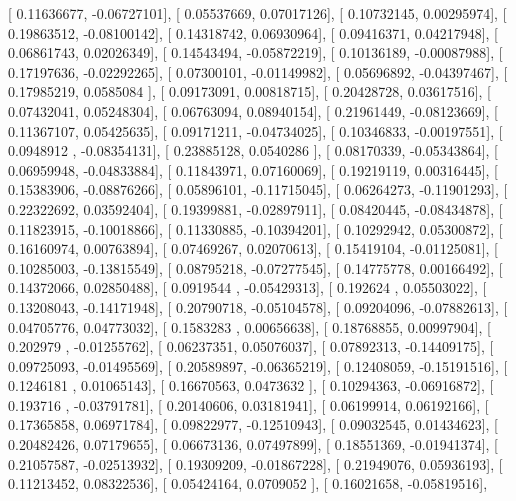 \documentclass{article}
\begin{document}
       [ 0.11636677, -0.06727101],
       [ 0.05537669,  0.07017126],
       [ 0.10732145,  0.00295974],
       [ 0.19863512, -0.08100142],
       [ 0.14318742,  0.06930964],
       [ 0.09416371,  0.04217948],
       [ 0.06861743,  0.02026349],
       [ 0.14543494, -0.05872219],
       [ 0.10136189, -0.00087988],
       [ 0.17197636, -0.02292265],
       [ 0.07300101, -0.01149982],
       [ 0.05696892, -0.04397467],
       [ 0.17985219,  0.0585084 ],
       [ 0.09173091,  0.00818715],
       [ 0.20428728,  0.03617516],
       [ 0.07432041,  0.05248304],
       [ 0.06763094,  0.08940154],
       [ 0.21961449, -0.08123669],
       [ 0.11367107,  0.05425635],
       [ 0.09171211, -0.04734025],
       [ 0.10346833, -0.00197551],
       [ 0.0948912 , -0.08354131],
       [ 0.23885128,  0.0540286 ],
       [ 0.08170339, -0.05343864],
       [ 0.06959948, -0.04833884],
       [ 0.11843971,  0.07160069],
       [ 0.19219119,  0.00316445],
       [ 0.15383906, -0.08876266],
       [ 0.05896101, -0.11715045],
       [ 0.06264273, -0.11901293],
       [ 0.22322692,  0.03592404],
       [ 0.19399881, -0.02897911],
       [ 0.08420445, -0.08434878],
       [ 0.11823915, -0.10018866],
       [ 0.11330885, -0.10394201],
       [ 0.10292942,  0.05300872],
       [ 0.16160974,  0.00763894],
       [ 0.07469267,  0.02070613],
       [ 0.15419104, -0.01125081],
       [ 0.10285003, -0.13815549],
       [ 0.08795218, -0.07277545],
       [ 0.14775778,  0.00166492],
       [ 0.14372066,  0.02850488],
       [ 0.0919544 , -0.05429313],
       [ 0.192624  ,  0.05503022],
       [ 0.13208043, -0.14171948],
       [ 0.20790718, -0.05104578],
       [ 0.09204096, -0.07882613],
       [ 0.04705776,  0.04773032],
       [ 0.1583283 ,  0.00656638],
       [ 0.18768855,  0.00997904],
       [ 0.202979  , -0.01255762],
       [ 0.06237351,  0.05076037],
       [ 0.07892313, -0.14409175],
       [ 0.09725093, -0.01495569],
       [ 0.20589897, -0.06365219],
       [ 0.12408059, -0.15191516],
       [ 0.1246181 ,  0.01065143],
       [ 0.16670563,  0.0473632 ],
       [ 0.10294363, -0.06916872],
       [ 0.193716  , -0.03791781],
       [ 0.20140606,  0.03181941],
       [ 0.06199914,  0.06192166],
       [ 0.17365858,  0.06971784],
       [ 0.09822977, -0.12510943],
       [ 0.09032545,  0.01434623],
       [ 0.20482426,  0.07179655],
       [ 0.06673136,  0.07497899],
       [ 0.18551369, -0.01941374],
       [ 0.21057587, -0.02513932],
       [ 0.19309209, -0.01867228],
       [ 0.21949076,  0.05936193],
       [ 0.11213452,  0.08322536],
       [ 0.05424164,  0.0709052 ],
       [ 0.16021658, -0.05819516],
\end{document}
